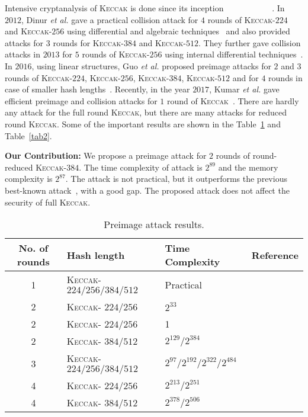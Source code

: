 \documentclass[runningheads]{llncs}
\newcommand{\KECCAK}{\mbox{\textsc{Keccak}}}
\newcommand{\Keccak}{\mbox{\textsc{Keccak}}}
\newcommand{\etal}{\textit{et al. }}
\begin{document}
Intensive cryptanalysis of \KECCAK{} is done since its inception ~\cite{bernstein2010second}~\cite{naya2011practical}~\cite{dinur2012new}~\cite{dinur2013collision}~\cite{morawiecki2013sat}~\cite{dinur2014improved}~\cite{chang20141st}~\cite{guo2016linear}~\cite{qiao2017new}~\cite{song2017non}~\cite{kumar2018cryptanalysis}. In $2012$, Dinur \etal  gave a practical collision attack for $4$ rounds of \Keccak-$224$ and \Keccak-$256$ using differential and algebraic techniques~\cite{dinur2012new} and also provided attacks for $3$ rounds for \Keccak-$384$ and \Keccak-$512$. They further gave collision attacks in $2013$ for $5$ rounds of \Keccak-$256$ using internal differential techniques~\cite{dinur2013collision}. In $2016$, using linear structures, Guo \etal proposed preimage attacks for $2$ and $3$ rounds of \Keccak-$224$, \Keccak-$256$, \Keccak-$384$, \Keccak-$512$ and for $4$ rounds in case of smaller hash lengths~\cite{guo2016linear}. Recently, in the year $2017$, Kumar \etal gave efficient preimage and collision attacks for $1$ round of \Keccak~\cite{kumar2018cryptanalysis}. There are hardly any attack for the full round \KECCAK{}, but there are many attacks for reduced round \Keccak{}. Some of the important results are shown in the Table~\ref{tab1} and Table~\ref{tab2}.
\newline

\textbf{Our Contribution:} We propose a preimage attack for $2$ rounds of round-reduced \KECCAK-$384$. The time complexity of attack is $2^{89}$ and the memory complexity is $2^{87}$. The attack is not practical, but it outperforms the previous best-known attack~\cite{guo2016linear}, with a good gap. The proposed attack does not affect the security of full \KECCAK{}.

\begin{table}
\begin{center}
\caption{Preimage attack results.}\label{tab1}
\begin{tabular}{|c|l|l|c|}
\hline
No. of rounds & Hash length & Time Complexity & Reference\\
\hline
1 & \Keccak - $224/256/384/512$ & Practical & ~\cite{kumar2018cryptanalysis} \\
2 & \Keccak - $224/256$ & $2^{33}$ & ~\cite{naya2011practical} \\
2 & \Keccak - $224/256$ & 1 & ~\cite{guo2016linear} \\
2 & \Keccak - $384/512$ & $2^{129} / 2^{384}$ & ~\cite{guo2016linear}\\
3 & \Keccak - $224/256/384/512$ & $2^{97} / 2^{192} / 2^{322} / 2^{484}$ & ~\cite{guo2016linear}\\
4 & \Keccak - $224/256$ & $2^{213} / 2^{251}$ & ~\cite{guo2016linear}\\
4 & \Keccak - $384/512$ & $2^{378} / 2^{506}$ & ~\cite{morawiecki2013rotational}\\
\hline
\end{tabular}
\end{center}
\end{table}
\end{document}
